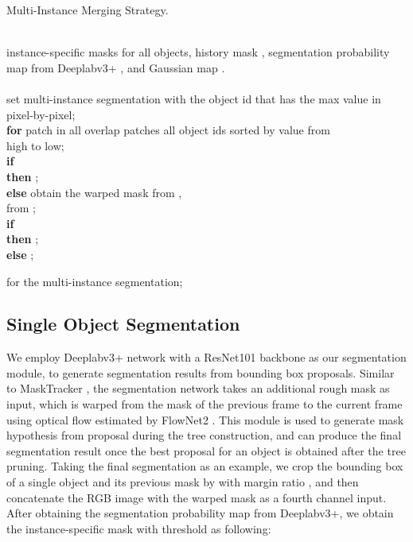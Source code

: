 \documentclass[10pt,twocolumn,letterpaper]{article}
\begin{document}
\begin{algorithm}[t]
\caption{Multi-Instance Merging Strategy.}   
\label{alg:merge}   
\begin{algorithmic}
\REQUIRE ~~\\ 
instance-specific masks  for all objects, history mask , segmentation probability map from Deeplabv3+ , and Gaussian map .\\ 

\ENSURE ~~\\ 
\STATE set multi-instance segmentation  with the object id that has the max value in   pixel-by-pixel; \\
\textbf{for} {patch  in all overlap patches}  
\STATE \quad  all object ids sorted by value  from\\ \quad high to low; \\
\quad \textbf{if} { \\ \quad \qquad \qquad } \textbf{then}
\STATE \quad \quad ; \\
\quad \textbf{else}
\STATE \qquad obtain the warped mask  from ,  \\ \qquad  from ; \\
\qquad \textbf{if} { \\ \qquad \qquad \qquad } \textbf{then}
\STATE \qquad \quad ; \\
\qquad \textbf{else}
\STATE \qquad \quad ;

\RETURN  for the multi-instance segmentation; 

\end{algorithmic}  
\end{algorithm} 

\subsection{Single Object Segmentation}
\label{single_object_segmentation}
\vspace{-5pt}

We employ Deeplabv3+ \cite{chen2018encoder} network with a ResNet101 \cite{He2015Deep} backbone as our segmentation module, to generate segmentation results from bounding box proposals. 
Similar to MaskTracker \cite{perazzi2017learning}, the segmentation network takes an additional rough mask as input, which is warped from the mask of the previous frame to the current frame using optical flow estimated by FlowNet2 \cite{ilg2017flownet}. 
This module is used to generate mask hypothesis from proposal during the tree construction, and can produce the final segmentation result once the best proposal for an object is obtained after the tree pruning. 
Taking the final segmentation as an example, we crop the bounding box of a single object and its previous mask by  with margin ratio , and then concatenate the RGB image with the warped mask  as a fourth channel input. 
After obtaining the segmentation probability map  from  Deeplabv3+, we obtain the instance-specific mask  with threshold  as following:
\end{document}
